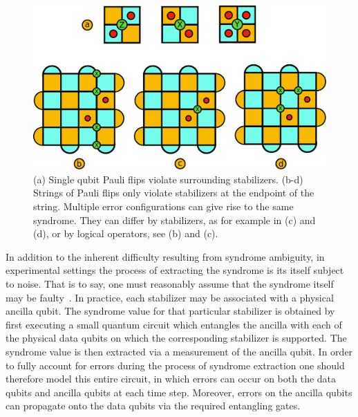 \documentclass[twocolumn,preprintnumbers,amsmath,amssymb,notitlepage,nofootinbib,longbibliography,superscriptaddress,aps,pra,10pt]{revtex4-1}
\begin{document}
	\begin{figure}
		\centering
		\includegraphics[width=1\linewidth]{figures/surface_code_examples.pdf}
		\caption{
			(a) Single qubit Pauli flips violate surrounding stabilizers.
			(b-d) Strings of Pauli flips only violate stabilizers at the endpoint of the string.
			Multiple error configurations can give rise to the same syndrome.
			They can differ by stabilizers, as for example in (c) and (d), or by logical operators, see (b) and (c).
		}
		\label{f:surface_code_examples}
	\end{figure}

	In addition to the inherent difficulty resulting from syndrome ambiguity, in experimental settings the process of extracting the syndrome is %
	its itself subject to noise.
	That is to say, one must reasonably assume that the syndrome itself may be faulty~\cite{tomita2014low,stephens2014fault}.
	In practice, each stabilizer may be associated with a physical ancilla qubit.
	The syndrome value for that particular stabilizer is obtained by first executing a small quantum circuit which entangles the ancilla with each of the physical data qubits on which the corresponding stabilizer is supported.
	The syndrome value is then extracted via a measurement of the ancilla qubit.
	In order to fully account for errors during the process of syndrome extraction one should therefore model this entire circuit, in which errors can occur on both the data qubits and ancilla qubits at each time step.
	Moreover, errors on the ancilla qubits can propagate onto the data qubits via the required entangling gates.
\end{document}
